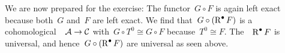 We are now prepared for the exercise:
The functor~$G \circ F$ is again left exact because both~$G$ and~$F$ are left exact.
We find that~$G \circ (\operatorname{R}^\bullet F)$ is a cohomological~{\deltafun}~$\mathcal{A} \to \mathcal{C}$ with~$G \circ T^0 \cong G \circ F$ because~$T^0 \cong F$.
The~{\deltafun}~$\operatorname{R}^\bullet F$ is universal, and hence~$G \circ (\operatorname{R}^\bullet F)$ are universal as seen above.





